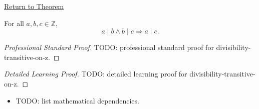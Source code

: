 \newpage
{}
\label{prf:divisibility-transitive-on-z}

\begin{remark*}[Return]
\hyperref[prop:divisibility-transitive-on-z]{Return to Theorem}
\end{remark*}

\begin{proposition*}
For all $a,b,c\in\mathbb{Z}$,
\[
a\mid b\land b\mid c \Longrightarrow a\mid c.
\]
\end{proposition*}

\begin{proof}[Professional Standard Proof]
\LRAProofBodyStart
TODO: professional standard proof for divisibility-transitive-on-z.
\end{proof}

\begin{proof}[Detailed Learning Proof]
\LRAProofBodyStart
TODO: detailed learning proof for divisibility-transitive-on-z.
\end{proof}

\begin{remark*}
\end{remark*}

\begin{dependencies}
\begin{itemize}
  \item TODO: list mathematical dependencies.
\end{itemize}
\end{dependencies}

\clearpage
